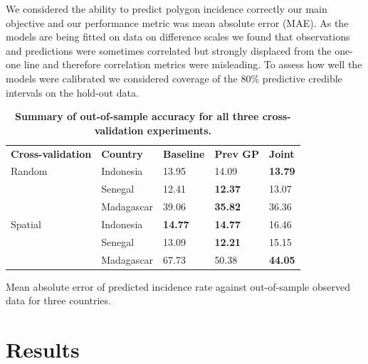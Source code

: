 \documentclass[10pt,letterpaper]{article}
\newlength\savedwidth
\newcommand\thickhline{\noalign{\global\savedwidth\arrayrulewidth\global\arrayrulewidth 2pt}%
\hline
\noalign{\global\arrayrulewidth\savedwidth}}
\begin{document}
We considered the ability to predict polygon incidence correctly our main objective and our performance metric was mean absolute error (MAE).
As the models are being fitted on data on difference scales we found that observations and predictions were sometimes correlated but strongly displaced from the one-one line and therefore correlation metrics were misleading.
To assess how well the models were calibrated we considered coverage of the 80\% predictive credible intervals on the hold-out data.




\begin{table}[!t]
\begin{adjustwidth}{-2.25in}{0in} %
\centering
\caption{
{\bf Summary of out-of-sample accuracy for all three cross-validation experiments.}}
\begin{tabular}{lllll}
\hline
{\bf Cross-validation} & {\bf Country}  & {\bf Baseline} & {\bf Prev GP} & {\bf Joint} \\
\thickhline 
Random & Indonesia  & 13.95 &  14.09 &  {\bf 13.79}\\
& Senegal  & 12.41 &  {\bf 12.37} &  13.07\\
& Madagascar  & 39.06 &  {\bf 35.82} &  36.36\vspace{3mm}\\
Spatial & Indonesia & {\bf 14.77} &  {\bf 14.77} &  16.46\\
& Senegal  & 13.09 &  {\bf 12.21} &  15.15\\
& Madagascar & 67.73 &  50.38 &  {\bf 44.05}\\
\end{tabular}
\begin{flushleft}
Mean absolute error of predicted incidence rate against out-of-sample observed data for three countries.
\end{flushleft}
\label{table1}
\end{adjustwidth}
\end{table}





\section*{Results}
\end{document}
